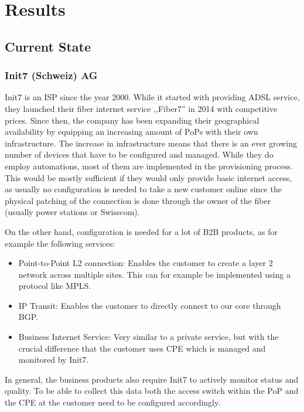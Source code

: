\chapter{\label{results}Results}
\thispagestyle{fancy}

\section{Current State}

\subsection{Init7 (Schweiz) AG}

Init7 is an \acrshort{ISP} since the year 2000. While it started with providing \acrshort{ADSL} service, they launched their fiber internet service
,,Fiber7'' in 2014 with competitive prices. Since then, the company has been expanding their geographical availability by
equipping an increasing amount of PoPs with their own infrastructure. The increase in infrastructure means that there is
an ever growing number of devices that have to be configured and managed. While they do employ automations, most of them
are implemented in the provisioning process. This would be mostly sufficient if they would only provide basic internet access,
as usually no configuration is needed to take a new customer online since the physical patching of the connection is done through
the owner of the fiber (usually power stations or Swisscom).

On the other hand, configuration is needed for a lot of \acrfull{B2B} products, as for example the following services:
\begin{itemize}
    \item Point-to-Point L2 connection: Enables the customer to create a layer 2 network across multiple sites.
      This can for example be implemented using a protocol like \acrshort{MPLS}.
    \item IP Transit: Enables the customer to directly connect to our core through \acrshort{BGP}.
    \item Business Internet Service: Very similar to a private service, but with the crucial difference that the customer
       uses \acrfull{CPE} which is managed and monitored by Init7.
\end{itemize}

In general, the business products also require Init7 to actively monitor status and quality. To be able to collect this data
both the access switch within the \acrfull{PoP} and the \acrshort{CPE} at the customer need to be configured accordingly.

